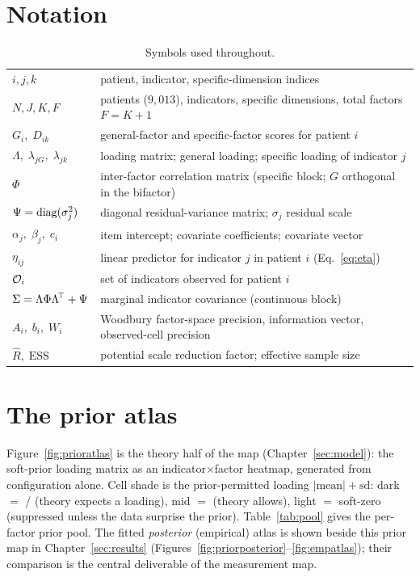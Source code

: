 \appendix
\section{Notation}
\label{app:notation}
\begin{table}[h]\centering\small\sffamily
\caption{Symbols used throughout.}
\begin{tabular}{L{2.6cm} L{11.6cm}}
\toprule
{} & \\
\midrule
{} $i,j,k$ & patient, indicator, specific-dimension indices\\
$N,J,K,F$ & patients ($9{,}013$), indicators, specific dimensions, total factors $F=K{+}1$\\
 $G_i,\;D_{ik}$ & general-factor and specific-factor scores for patient $i$\\
$\Lambda,\;\lambda_{jG},\;\lambda_{jk}$ & loading matrix; general loading; specific loading of indicator $j$\\
 $\Phi$ & inter-factor correlation matrix (specific block; $G$ orthogonal in the bifactor)\\
$\Psi=\operatorname{diag}(\sigma_j^2)$ & diagonal residual-variance matrix; $\sigma_j$ residual scale\\
 $\alpha_j,\;\beta_j,\;c_i$ & item intercept; covariate coefficients; covariate vector\\
$\eta_{ij}$ & linear predictor for indicator $j$ in patient $i$ (Eq.~\ref{eq:eta})\\
 $\mathcal{O}_i$ & set of indicators observed for patient $i$\\
$\Sigma=\Lambda\Phi\Lambda^{\!\top}+\Psi$ & marginal indicator covariance (continuous block)\\
 $A_i,\;b_i,\;W_i$ & Woodbury factor-space precision, information vector, observed-cell precision\\
$\widehat{R},\;\mathrm{ESS}$ & potential scale reduction factor; effective sample size\\
\bottomrule
\end{tabular}
\end{table}

\section{The prior atlas}
\label{app:prioratlas}
Figure~\ref{fig:prioratlas} is the theory half of the map (Chapter~\ref{sec:model}): the soft-prior loading
matrix as an indicator$\times$factor heatmap, generated from configuration alone. Cell shade is the
prior-permitted loading $|\text{mean}|+\text{sd}$: dark $=$ / (theory expects a
loading), mid $=$  (theory allows), light $=$ soft-zero (suppressed unless the data
surprise the prior). Table~\ref{tab:pool} gives the per-factor prior pool. The fitted \emph{posterior}
(empirical) atlas is shown beside this prior map in Chapter~\ref{sec:results}
(Figures~\ref{fig:priorposterior}--\ref{fig:empatlas}); their comparison is the central deliverable of the measurement map.

